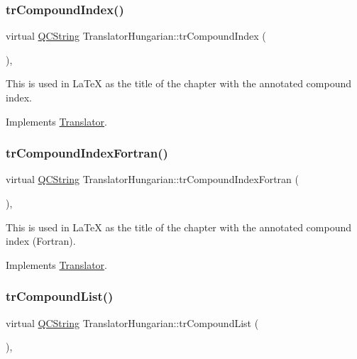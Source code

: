 \subsubsection{\texorpdfstring{trCompoundIndex()}{trCompoundIndex()}}
{\footnotesize\ttfamily virtual \mbox{\hyperlink{class_q_c_string}{Q\+C\+String}} Translator\+Hungarian\+::tr\+Compound\+Index (\begin{DoxyParamCaption}{ }\end{DoxyParamCaption})\hspace{0.3cm}{\ttfamily [inline]}, {\ttfamily [virtual]}}

This is used in La\+TeX as the title of the chapter with the annotated compound index. 

Implements \mbox{\hyperlink{class_translator}{Translator}}.

\mbox{\label{class_translator_hungarian_a23c043a213b3424aac1dd86139e736ee}} 
\subsubsection{\texorpdfstring{trCompoundIndexFortran()}{trCompoundIndexFortran()}}
{\footnotesize\ttfamily virtual \mbox{\hyperlink{class_q_c_string}{Q\+C\+String}} Translator\+Hungarian\+::tr\+Compound\+Index\+Fortran (\begin{DoxyParamCaption}{ }\end{DoxyParamCaption})\hspace{0.3cm}{\ttfamily [inline]}, {\ttfamily [virtual]}}

This is used in La\+TeX as the title of the chapter with the annotated compound index (Fortran). 

Implements \mbox{\hyperlink{class_translator}{Translator}}.

\mbox{\label{class_translator_hungarian_a18cf6e34c349b5b16015b84001d9346f}} 
\subsubsection{\texorpdfstring{trCompoundList()}{trCompoundList()}}
{\footnotesize\ttfamily virtual \mbox{\hyperlink{class_q_c_string}{Q\+C\+String}} Translator\+Hungarian\+::tr\+Compound\+List (\begin{DoxyParamCaption}{ }\end{DoxyParamCaption})\hspace{0.3cm}{\ttfamily [inline]}, {\ttfamily [virtual]}}

